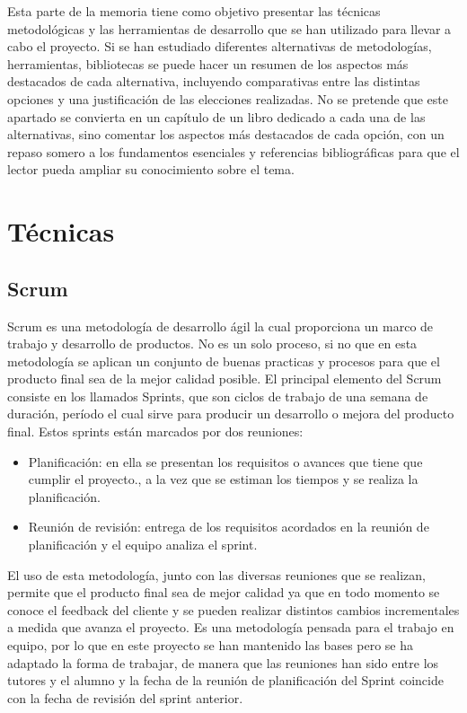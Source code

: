 
Esta parte de la memoria tiene como objetivo presentar las técnicas metodológicas y las herramientas de desarrollo que se han utilizado para llevar a cabo el proyecto. Si se han estudiado diferentes alternativas de metodologías, herramientas, bibliotecas se puede hacer un resumen de los aspectos más destacados de cada alternativa, incluyendo comparativas entre las distintas opciones y una justificación de las elecciones realizadas. 
No se pretende que este apartado se convierta en un capítulo de un libro dedicado a cada una de las alternativas, sino comentar los aspectos más destacados de cada opción, con un repaso somero a los fundamentos esenciales y referencias bibliográficas para que el lector pueda ampliar su conocimiento sobre el tema.

\section{Técnicas}

\subsection{Scrum}
Scrum es una metodología de desarrollo ágil la cual proporciona un marco de trabajo y desarrollo de productos. No es un solo proceso, si no que en esta metodología se aplican un conjunto de buenas practicas y procesos para que el producto final sea de la mejor calidad posible.
El principal elemento del Scrum consiste en los llamados Sprints, que son ciclos de trabajo de una semana de duración, período el cual sirve para producir un desarrollo o mejora del producto final. Estos sprints están marcados por dos reuniones:
\begin{itemize}
	\item Planificación: en ella se presentan los requisitos o avances que tiene que cumplir el proyecto., a la vez que se estiman los tiempos y se realiza la planificación.
	\item Reunión de revisión: entrega de los requisitos acordados en la reunión de planificación y el equipo analiza el sprint.
\end{itemize}
El uso de esta metodología, junto con las diversas reuniones que se realizan, permite que el producto final sea de mejor calidad ya que en todo momento se conoce el feedback del cliente y se pueden realizar distintos cambios incrementales a medida que avanza el proyecto.
Es una metodología pensada para el trabajo en equipo, por lo que en este proyecto se han mantenido las bases pero se ha adaptado la forma de trabajar, de manera que las reuniones han sido entre los tutores y el alumno y la fecha de la reunión de planificación del Sprint coincide con la fecha de revisión del sprint anterior.

